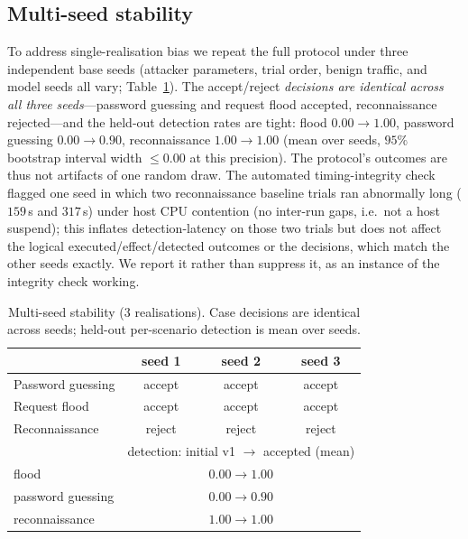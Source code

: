 \documentclass[journal]{IEEEtran}
\begin{document}
\subsection{Multi-seed stability}
\label{sec:multiseed}
To address single-realisation bias we repeat the full protocol under three independent base seeds
(attacker parameters, trial order, benign traffic, and model seeds all vary; Table~\ref{tab:multiseed}).
The accept/reject \emph{decisions are identical across all three seeds}---password guessing and request
flood accepted, reconnaissance rejected---and the held-out detection rates are tight: flood
$0.00\!\to\!1.00$, password guessing $0.00\!\to\!0.90$, reconnaissance $1.00\!\to\!1.00$ (mean over
seeds, $95\%$ bootstrap interval width $\leq 0.00$ at this precision). The protocol's outcomes are thus
not artifacts of one random draw. The automated timing-integrity check flagged one seed in which two
reconnaissance baseline trials ran abnormally long ($159$\,s and $317$\,s) under host CPU contention
(no inter-run gaps, i.e.\ not a host suspend); this inflates detection-latency on those two trials but
does not affect the logical executed/effect/detected outcomes or the decisions, which match the other
seeds exactly. We report it rather than suppress it, as an instance of the integrity check working.

\begin{table}[t]
\caption{Multi-seed stability (3 realisations). Case decisions are identical across seeds; held-out
per-scenario detection is mean over seeds.}
\label{tab:multiseed}
\centering
\small
\begin{tabular}{@{}lccc@{}}
\toprule
 & seed 1 & seed 2 & seed 3 \\
\midrule
Password guessing & accept & accept & accept \\
Request flood     & accept & accept & accept \\
Reconnaissance    & reject & reject & reject \\
\midrule
 & \multicolumn{3}{c}{detection: initial v1 $\to$ accepted (mean)} \\
\midrule
flood             & \multicolumn{3}{c}{$0.00 \to 1.00$} \\
password guessing & \multicolumn{3}{c}{$0.00 \to 0.90$} \\
reconnaissance    & \multicolumn{3}{c}{$1.00 \to 1.00$} \\
\bottomrule
\end{tabular}
\end{table}
\end{document}
